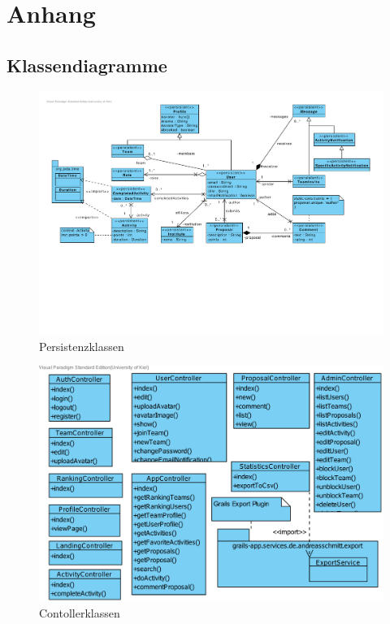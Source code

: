 \section{Anhang}
\subsection{Klassendiagramme}

\begin{figure}[H]
  \centering
  \includegraphics[width=18cm, trim=1cm 7cm 1cm 1cm, clip, angle=90]{gfx/persistent_classes}
  \caption{Persistenzklassen}
\end{figure}

\begin{figure}[H]
  \centering
  \includegraphics[width=\textwidth, trim=1cm 6cm 6cm 1cm, clip]{gfx/controller_classes}
  \caption{Contollerklassen}
\end{figure}

